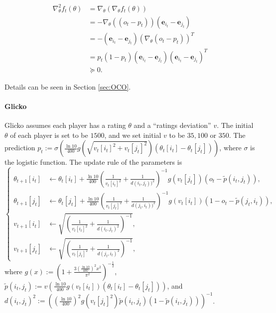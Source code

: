 \begin{align*}
    \nabla^2_{\theta} f_t(\theta) &= \nabla_{\theta} (\nabla_{\theta} f_t(\theta)) \\
    &= -\nabla_{\theta} ( (o_t - p_t) )(\boldsymbol{e}_{i_t}- \boldsymbol{e}_{j_t}) \\
    &= -(\boldsymbol{e}_{i_t}- \boldsymbol{e}_{j_t}) (\nabla_{\theta}(o_t - p_t) )^T \\
    &= p_t (1-p_t) (\boldsymbol{e}_{i_t}- \boldsymbol{e}_{j_t}) (\boldsymbol{e}_{i_t}- \boldsymbol{e}_{j_t})^{T}\\
    & \succeq 0.
\end{align*}



Details can be seen in Section \ref{sec:OCO}.

\paragraph{Glicko} Glicko \citep{glickman1995glicko} assumes each player has a rating $\theta$ and  a “ratings deviation” $v$. The initial $\theta$ of each player is set to be $1500$, and
we set initial $v$ to be $35,100$ or $350$. The prediction $p_t:= \sigma( \frac{\ln 10}{400} g(\sqrt{v_t[i_t]^2 + v_t[j_t]^2}) (\theta_t[i_t] - \theta_{t}[j_t]) )$, where $\sigma$ is the logistic function. The update rule of the parameters is
\begin{equation}
    \begin{cases}
    \theta_{t+1}[i_t] &\gets \theta_{t}[i_t] + \frac{\ln 10}{400} (\frac{1}{v_t[i_t]^2} + \frac{1}{d(i_t,j_t))^2})^{-1} g(v_{t}[j_t])(o_t - \tilde{p}(i_t,j_t)), \\
    \theta_{t+1}[j_t] &\gets \theta_{t}[j_t] + \frac{\ln 10}{400} (\frac{1}{v_t[j_t]^2} + \frac{1}{d(j_t,i_t))^2})^{-1} g(v_{t}[i_t])(1- o_t - \tilde{p}(j_t,i_t)), \\
    v_{t+1}[i_t] &\gets \sqrt{(\frac{1}{v_{t}[i_t]^2} + \frac{1}{d(i_t,j_t)^2})^{-1}} , \\
    v_{t+1}[j_t] &\gets \sqrt{(\frac{1}{v_{t}[j_t]^2} + \frac{1}{d(j_t,i_t)^2})^{-1}} ,
    \end{cases}
\end{equation}
where $g(x):= (1 + \frac{3 (\frac{\ln 10}{400})^2 x^2 }{\pi^2})^{-\frac12}$, $\tilde{p}(i_t,j_t):= v( \frac{\ln 10}{400} g(v_t[i_t]) (\theta_t[i_t] - \theta_{t}[j_t]) )$, and $d(i_t,j_t)^2 := ((\frac{\ln 10}{400})^2 g(v_t[j_t]^2) \tilde{p}(i_t,j_t) (1- \tilde{p}(i_t,j_t)))^{-1}$.

